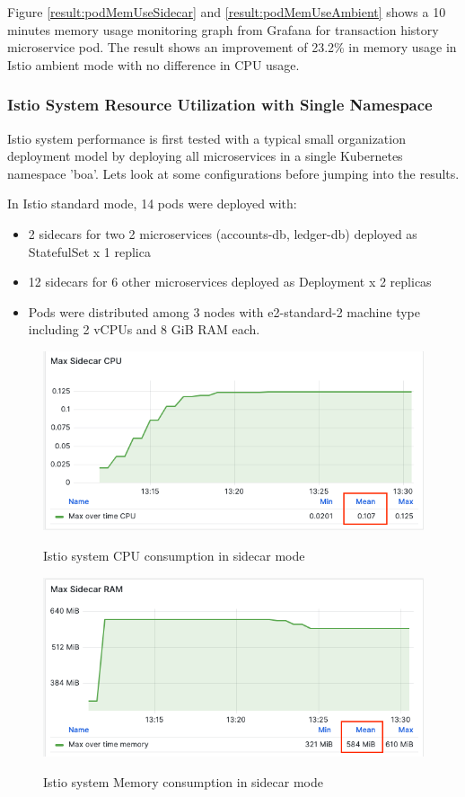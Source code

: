 Figure \ref{result:podMemUseSidecar} and \ref{result:podMemUseAmbient} shows a 10 minutes memory usage monitoring graph from Grafana for transaction history microservice pod. The result shows an improvement of 23.2\% in memory usage in Istio ambient mode with no difference in CPU usage.

\subsubsection{Istio System Resource Utilization with Single Namespace}
Istio system performance is first tested with a typical small organization deployment model by deploying all microservices in a single Kubernetes namespace 'boa'. Lets look at some configurations before jumping into the results.

In Istio standard mode, 14 pods were deployed  with:
\begin{itemize}
    \item 2 sidecars for two 2 microservices (accounts-db, ledger-db) deployed as StatefulSet x 1 replica
    \item 12 sidecars for 6 other microservices deployed as Deployment x 2 replicas
    \item Pods were distributed among 3 nodes with e2-standard-2 machine type including 2 vCPUs and 8 GiB RAM each.
\end{itemize}


\begin{figure}[ht!]
    \centering
    \caption{Istio system CPU consumption in sidecar mode}
    \includegraphics[width=0.9\linewidth]{resources/max-sidecar-cpu.png}
    \label{result:maxSidecarCpu}
\end{figure}

\begin{figure}[ht!]
    \centering
    \caption{Istio system Memory consumption in sidecar mode}
    \includegraphics[width=0.9\linewidth]{resources/max-sidecar-ram.png}
    \label{result:maxSidecarRam}
\end{figure}



